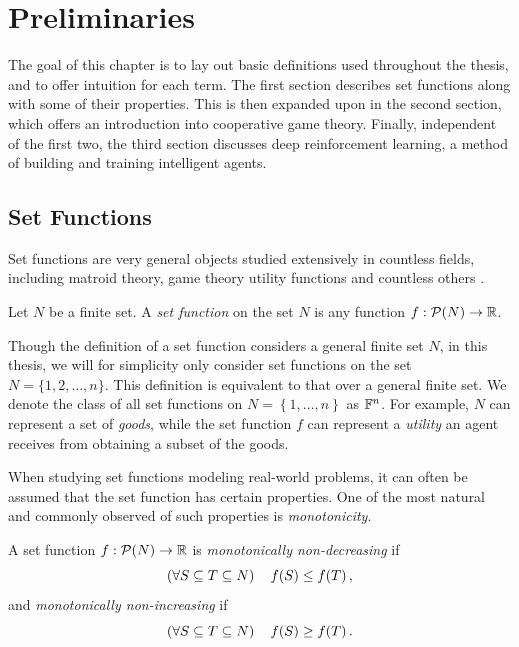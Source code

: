 \chapter{Preliminaries}
\label{chap:prel}

The goal of this chapter is to lay out basic definitions used throughout the thesis, and to offer intuition for each term.
The first section describes set functions along with some of their properties.
This is then expanded upon in the second section, which offers an introduction into cooperative game theory.
Finally, independent of the first two, the third section discusses deep reinforcement learning, a method of building and training intelligent agents. %

\section{Set Functions}

Set functions are very general objects studied extensively in countless fields, including
matroid theory, game theory utility functions and countless others \citep{10.1093/acprof:oso/9780198566946.001.0001,grabisch2016set,peters2015game,doi:10.1287/ijoc.15.3.284.16077}.

\begin{defi}
	Let $ N $ be a finite set.
	A \emph{set function} on the set $ N $ is any function $ f: \mathcal{P}\!\left(N\right) \to \mathbb{R} $.
\end{defi}

Though the definition of a set function considers a general finite set $ N $, in this thesis, we will for simplicity only consider set functions on the set $ N = \{1, 2, \ldots, n\} $.
This definition is equivalent to that over a general finite set.
We denote the class of all set functions on $ N = \left\{ 1, \ldots, n \right\} $ as $ \mathbb{F}^n $.
For example, $ N $ can represent a set of \emph{goods}, while the set function $ f $ can represent a \emph{utility} an agent receives from obtaining a subset of the goods.

When studying set functions modeling real-world problems, it can often be assumed that the set function has certain properties.
One of the most natural and commonly observed of such properties is \emph{monotonicity}.

\begin{defi}[Monotonicity]
	A set function $ f: \mathcal{P}\!\left(N\right) \to \mathbb{R} $ is \emph{monotonically non-decreasing} if \[
		\left( \forall S \subseteq T \subseteq N \right)\quad f\!\left(S\right) \leq f\!\left(T\right),
	\]
	and \emph{monotonically non-increasing} if \[
		\left( \forall S \subseteq T \subseteq N \right)\quad f\!\left(S\right) \geq f\!\left(T\right).
	\]
\end{defi}

